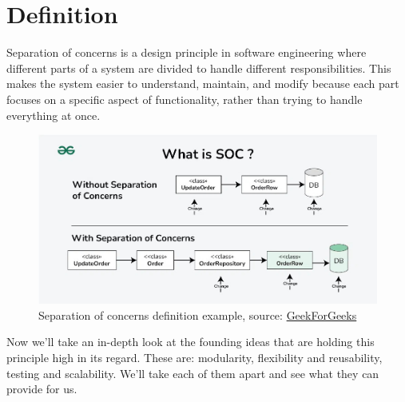 \section{Definition}
Separation of concerns is a design principle in software engineering where different parts of a system are divided to handle different responsibilities.
This makes the system easier to understand, maintain, and modify because each part focuses on a specific aspect of functionality, rather than trying to handle everything at once.
\begin{figure}[htbp]
    \centering
    \includegraphics[scale=0.4]{pictures/soc_definition_example.jpg}
    \caption{Separation of concerns definition example, source: \href{https://www.geeksforgeeks.org/separation-of-concerns-soc/}{GeekForGeeks}}
    \label{arpanetLogicaMap}
\end{figure}
\par
Now we'll take an in-depth look at the founding ideas that are holding this principle high in its regard.
These are: modularity, flexibility and reusability, testing and scalability.
We'll take each of them apart and see what they can provide for us.


